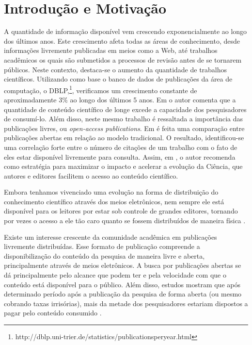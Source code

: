 \chapter{Introdução e Motivação}
A quantidade de informação disponível vem crescendo exponencialmente ao longo dos últimos anos. Este crescimento afeta todas as áreas de conhecimento, desde informações livremente publicadas em meios como a Web, até trabalhos acadêmicos os quais são submetidos a processos de revisão antes de se tornarem públicos. Neste contexto, destaca-se o aumento da quantidade de trabalhos científicos. Utilizando como base o banco de dados de publicações da área de computação, o DBLP,\footnote{http://dblp.uni-trier.de/statistics/publicationsperyear.html}, verificamos um crescimento constante de aproximadamente 3\% ao longo dos últimos 5 anos. Em \cite{Online2001} o autor comenta que a quantidade de conteúdo científico de longe excede a capacidade dos pesquisadores de consumí-lo. Além disso, neste mesmo trabalho é ressaltada a importância das publicações livres, ou \textit{open-access publications}. Em \cite{Comparing2004} é feita uma comparação entre publicações abertas em relação ao modelo tradicional. O resultado, identificou-se uma correlação forte entre o número de citações de um trabalho com o fato de eles estar disponível livremente para consulta. Assim, em \cite{Online2001}, o autor recomenda como estratégia para maximizar o impacto e acelerar a evolução da Ciência, que autores e editores facilitem o acesso ao conteúdo científico.

Embora tenhamos vivenciado uma evolução na forma de distribuição do conhecimento científico através dos meios eletrônicos, nem sempre ele está disponível para os leitores por estar sob controle de grandes editores, tornando por vezes o acesso a ele tão caro quanto se fossem distribuídos de maneira física \cite{OpenAccess2004}.

Existe um interesse crescente da comunidade acadêmica em publicações livremente distribuídas. Esse formato de publicação compreende a disponibilização do conteúdo da pesquisa de maneira livre e aberta, principalmente através de meios eletrônicos. A busca por publicações abertas se dá principalmente pelo alcance que podem ter e pela velocidade com que o conteúdo está disponível para o público. Além disso, estudos mostram que após determinado período após a publicação da pesquisa de forma aberta (ou mesmo cobrando taxas irrisórias), mais da metade dos pesquisadores estariam dispostos a pagar pelo conteúdo consumido \cite{Societies2002Misc}.

